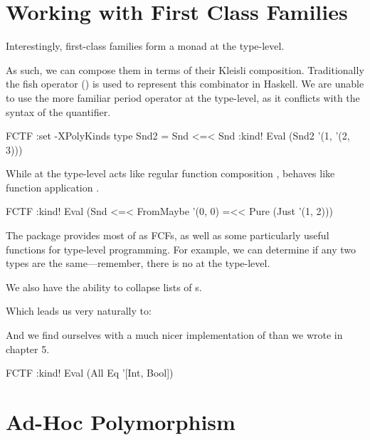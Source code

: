 \documentclass[book.tex]{subfiles}
\begin{document}
\section{Working with First Class Families}

Interestingly, first-class families form a monad at the type-level.


As such, we can compose them in terms of their Kleisli composition.
Traditionally the fish operator (\hs{<=<}) is used to represent this combinator
in Haskell.  We are unable to use the more familiar period operator at the
type-level, as it conflicts with the syntax of the  quantifier.


\begin{dorepl}{FCTF}
:set -XPolyKinds
type Snd2 = Snd <=< Snd
:kind! Eval (Snd2 '(1, '(2, 3)))
\end{dorepl}

While \ty{(<=<)} at the type-level acts like regular function composition
, \ty{(=<<)} behaves like function application \hs{(\$)}.

\begin{dorepl}{FCTF}
:kind! Eval (Snd <=< FromMaybe '(0, 0) =<< Pure (Just '(1, 2)))
\end{dorepl}

The \cite{fcf} package provides most of 
as FCFs, as well as some particularly useful functions for type-level
programming. For example, we can determine if any two types are the
same---remember, there is no  at the type-level.


We also have the ability to collapse lists of s.


Which leads us very naturally to:


And we find ourselves with a much nicer implementation of  than we wrote
in chapter 5.


\begin{dorepl}{FCTF}
:kind! Eval (All Eq '[Int, Bool])
\end{dorepl}


\section{Ad-Hoc Polymorphism}
\end{document}

